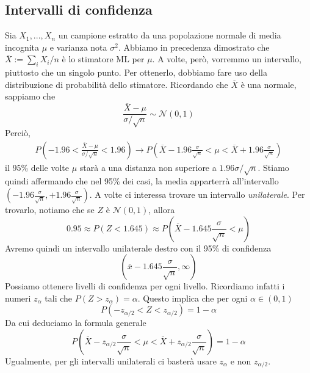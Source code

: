 \documentclass[11pt]{article}
\begin{document}
\subsection{Intervalli di confidenza}
Sia $X_1,...,X_n$ un campione estratto da una popolazione normale di media incognita $\mu$ e varianza nota $\sigma^2$. Abbiamo in precedenza dimostrato che $\overline{X}:=\sum_i X_i/n$ è lo stimatore ML per $\mu$. A volte, però, vorremmo un intervallo, piuttosto che un singolo punto. Per ottenerlo, dobbiamo fare uso della distribuzione di probabilità dello stimatore. Ricordando che $\overline{X}$ è una normale, sappiamo che
\begin{displaymath}
\frac{\overline{X}-\mu}{\sigma/\sqrt{n}} \sim \mathcal{N}(0,1)    
\end{displaymath}
Perciò, 
\begin{gather*}
    P\left(-1.96<\frac{\overline{X}-\mu}{\sigma/\sqrt{n}}<1.96\right)\rightarrow
    P\left(\overline{X}-1.96\frac{\sigma}{\sqrt{n}}<\mu<\overline{X}+1.96\frac{\sigma}{\sqrt{n}}\right)
\end{gather*}
il 95\% delle volte $\mu$ starà a una distanza non superiore a $1.96\sigma/\sqrt{n}$. Stiamo quindi affermando che nel 95\% dei casi, la media apparterrà all'intervallo $\left(-1.96\frac{\sigma}{\sqrt{n}}, +1.96\frac{\sigma}{\sqrt{n}}\right)$.
A volte ci interessa trovare un intervallo \textit{unilaterale}. Per trovarlo, notiamo che se $Z$ è $\mathcal{N}(0,1)$, allora
\begin{displaymath}
    0.95\approx P(Z< 1.645) \approx P\left(\overline{X}-1.645\frac{\sigma}{\sqrt{n}}<\mu\right)
\end{displaymath}
Avremo quindi un intervallo unilaterale destro con il 95\% di confidenza 
\begin{displaymath}
    \left(\overline{x}-1.645\frac{\sigma}{\sqrt{n}},\infty\right)
\end{displaymath}
Possiamo ottenere livelli di confidenza per ogni livello. Ricordiamo infatti i numeri $z_\alpha$ tali che $P(Z>z_\alpha) = \alpha$. Questo implica che per ogni $\alpha \in (0,1)$ 
\begin{displaymath}
    P(-z_{\alpha/2}<Z<z_{\alpha/2})=1-\alpha
\end{displaymath}
Da cui deduciamo la formula generale 
\begin{displaymath}
    P\left(\overline{X}-z_{\alpha/2}\frac{\sigma}{\sqrt{n}} < \mu <      \overline{X}+z_{\alpha/2}\frac{\sigma}{\sqrt{n}}\right) = 1-\alpha
\end{displaymath}
Ugualmente, per gli intervalli unilaterali ci basterà usare $z_\alpha$ e non $z_{\alpha/2}$.
\end{document}
